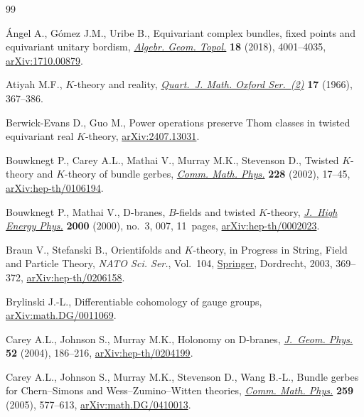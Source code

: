 \documentclass[10pt,a4paper]{amsart}
\numberwithin{equation}{section}
\begin{document}
\begin{thebibliography}{99}
\footnotesize\itemsep=-0.8pt\selectfont

{\'A}ngel A., G\'omez J.M., Uribe B., Equivariant complex bundles, fixed points
 and equivariant unitary bordism,
 \href{https://doi.org/10.2140/agt.2018.18.4001}{\textit{Algebr. Geom.
 Topol.}} \textbf{18} (2018), 4001--4035,
 \href{http://arxiv.org/abs/1710.00879}{arXiv:1710.00879}.

Atiyah M.F., {$K$}-theory and reality,
 \href{https://doi.org/10.1093/qmath/17.1.367}{\textit{Quart.~J. Math. Oxford
 Ser.~(2)}} \textbf{17} (1966), 367--386.

Berwick-Evans D., Guo M., Power operations preserve {T}hom classes in twisted
 equivariant real {$K$}-theory,
 \href{http://arxiv.org/abs/2407.13031}{arXiv:2407.13031}.

Bouwknegt P., Carey A.L., Mathai V., Murray M.K., Stevenson D., Twisted
 {$K$}-theory and {$K$}-theory of bundle gerbes,
 \href{https://doi.org/10.1007/s002200200646}{\textit{Comm. Math. Phys.}}
 \textbf{228} (2002), 17--45,
 \href{http://arxiv.org/abs/hep-th/0106194}{arXiv:hep-th/0106194}.

Bouwknegt P., Mathai V., D-branes, {$B$}-fields and twisted {$K$}-theory,
 \href{https://doi.org/10.1088/1126-6708/2000/03/007}{\textit{J.~High Energy
 Phys.}} \textbf{2000} (2000), no.~3, 007, 11~pages,
 \href{http://arxiv.org/abs/hep-th/0002023}{arXiv:hep-th/0002023}.

Braun V., Stefanski B., Orientifolds and {$K$}-theory, in Progress in {S}tring,
 {F}ield and {P}article {T}heory, \textit{NATO Sci. Ser.}, Vol.~104,
 \href{https://doi.org/10.1007/978-94-010-0211-0_16}{Springer}, Dordrecht,
 2003, 369--372,
 \href{http://arxiv.org/abs/hep-th/0206158}{arXiv:hep-th/0206158}.

Brylinski J.-L., Differentiable cohomology of gauge groups,
 \href{http://arxiv.org/abs/math.DG/0011069}{arXiv:math.DG/0011069}.

Carey A.L., Johnson S., Murray M.K., Holonomy on {D}-branes,
 \href{https://doi.org/10.1016/j.geomphys.2004.02.008}{\textit{J.~Geom.
 Phys.}} \textbf{52} (2004), 186--216,
 \href{http://arxiv.org/abs/hep-th/0204199}{arXiv:hep-th/0204199}.

Carey A.L., Johnson S., Murray M.K., Stevenson D., Wang B.-L., Bundle gerbes for
 {C}hern--{S}imons and {W}ess--{Z}umino--{W}itten theories,
 \href{https://doi.org/10.1007/s00220-005-1376-8}{\textit{Comm. Math. Phys.}}
 \textbf{259} (2005), 577--613,
 \href{http://arxiv.org/abs/math.DG/0410013}{arXiv:math.DG/0410013}.


\end{thebibliography}
\end{document}

